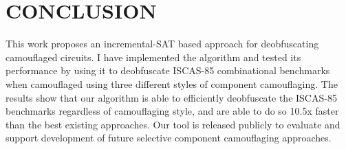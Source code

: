 \documentclass[proposal]{umassthesis}  %
\begin{document}
\chapter{CONCLUSION}

This work proposes an incremental-SAT based approach for deobfuscating camouflaged circuits. I have implemented the algorithm and tested its performance by using it to deobfuscate ISCAS-85 combinational benchmarks when camouflaged using three different styles of component camouflaging. The results show that our algorithm is able to efficiently deobfuscate the ISCAS-85 benchmarks regardless of camouflaging style, and are able to do so 10.5x faster than the best existing approaches. Our tool is released publicly to evaluate and support development of future selective component camouflaging approaches. 



\backmatter  %




\end{document}
